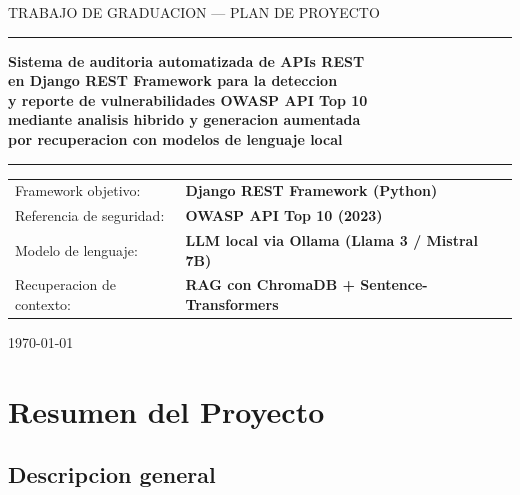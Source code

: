 \documentclass[12pt, a4paper]{article}
\begin{document}
\begin{titlepage}
  \centering
  \vspace*{2cm}

  {\color{graydark}\small\MakeUppercase{Trabajo de Graduacion --- Plan de Proyecto}}

  \vspace{1cm}
  {\color{primary}\rule{12cm}{1.5pt}}
  \vspace{0.6cm}

  {\Large\bfseries\color{textprimary}
    Sistema de auditoria automatizada de APIs REST\\[6pt]
    en Django REST Framework para la deteccion\\[6pt]
    y reporte de vulnerabilidades OWASP API Top 10\\[6pt]
    mediante analisis hibrido y generacion aumentada\\[6pt]
    por recuperacion con modelos de lenguaje local
  }

  \vspace{0.6cm}
  {\color{primary}\rule{12cm}{1.5pt}}
  \vspace{2cm}

  \begin{tabular}{ll}
    \color{graydark}Framework objetivo:      & \textbf{Django REST Framework (Python)} \\[4pt]
    \color{graydark}Referencia de seguridad: & \textbf{OWASP API Top 10 (2023)} \\[4pt]
    \color{graydark}Modelo de lenguaje:      & \textbf{LLM local via Ollama (Llama 3 / Mistral 7B)} \\[4pt]
    \color{graydark}Recuperacion de contexto:& \textbf{RAG con ChromaDB + Sentence-Transformers} \\[4pt]
  \end{tabular}

  \vfill
  {\color{graydark}\small\today}
\end{titlepage}

\tableofcontents
\newpage

\section{Resumen del Proyecto}

\subsection{Descripcion general}
\end{document}
